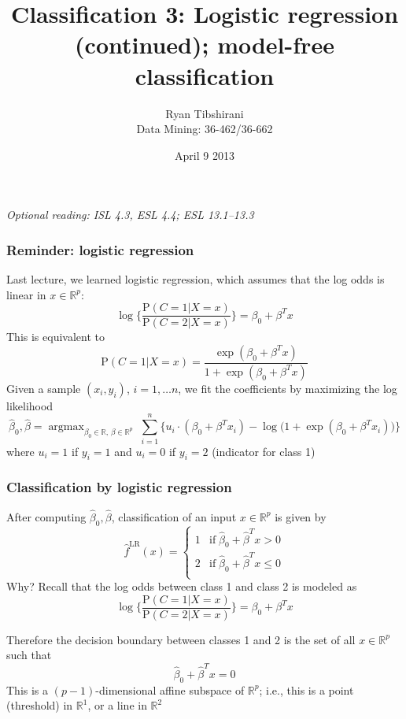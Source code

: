 \documentclass[mathserif]{beamer}
\newcommand{\argmax}{\mathop{\mathrm{argmax}}}
\def\P{\mathrm{P}}
\def\R{\mathds{R}}
\def\hbeta{\hat{\beta}}
\def\red{\color[rgb]{0.8,0,0}}
\begin{document}
\title{Classification 3: Logistic regression (continued); 
model-free classification}
\author{Ryan Tibshirani \\ Data Mining: 36-462/36-662}
\date{April 9 2013}

\begin{frame}
\maketitle
{\it Optional reading: ISL 4.3, ESL 4.4; ESL 13.1--13.3}
\end{frame} 

\begin{frame}
\frametitle{Reminder: logistic regression}
\smallskip
Last lecture, we learned {\red logistic regression}, which
assumes that the log odds is linear in $x \in \R^p$:
$$\log\Big\{\frac{\P(C=1|X=x)}{\P(C=2|X=x)}\Big\}
= \beta_0+\beta^T x$$
This is equivalent to
$$\P(C=1|X=x) = \frac{\exp(\beta_0+\beta^Tx)}
{1+\exp(\beta_0+\beta^Tx)}$$
Given a sample $(x_i,y_i)$, $i=1,\ldots n$, we fit the coefficients 
by maximizing the log likelihood
$$\hbeta_0,\hbeta = \argmax_{\beta_0\in\R, \,\beta \in \R^p} \;
\sum_{i=1}^n \Big\{u_i \cdot (\beta_0+\beta^T x_i) -
\log\big(1+\exp(\beta_0+\beta^Tx_i)\big) \Big\}$$
where $u_i=1$ if $y_i=1$ and $u_i=0$ if $y_i=2$ (indicator for class 1)
\end{frame}

\begin{frame}
\frametitle{Classification by logistic regression}
\smallskip
\smallskip
After computing $\hbeta_0,\hbeta$, {\red classification} of an input 
$x\in\R^p$  is given by
$$\hat{f}^{\mathrm{LR}}(x) = \begin{cases}
1 & \mathrm{if} \; \hbeta_0+\hbeta^T x > 0 \\
2 & \mathrm{if} \; \hbeta_0+\hbeta^T x \leq 0 \\
\end{cases}$$
Why? Recall that the log odds between class 1 and class 2 is modeled as
$$\log\Big\{\frac{\P(C=1|X=x)}{\P(C=2|X=x)}\Big\} 
= \beta_0+\beta^T x$$

\smallskip
Therefore the {\red decision boundary} between classes 1 and 2 is the set of 
all $x \in \R^p$ such that
$$\hbeta_0+\hbeta^T x = 0$$
This is a $(p-1)$-dimensional affine subspace of $\R^p$; i.e., this is a point
(threshold) in $\R^1$, or a line in $\R^2$
\end{frame}
\end{document}
